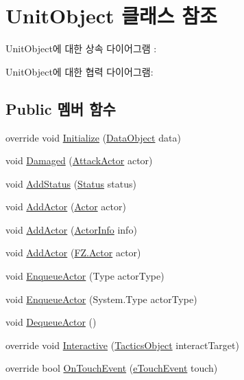 \hypertarget{class_unit_object}{}\section{Unit\+Object 클래스 참조}
\label{class_unit_object}


Unit\+Object에 대한 상속 다이어그램 \+: 


Unit\+Object에 대한 협력 다이어그램\+:
\subsection*{Public 멤버 함수}
\begin{DoxyCompactItemize}
\item 
override void \hyperlink{class_unit_object_acc70df752878272e4f9d0f0dc1f68f84}{Initialize} (\hyperlink{class_data_object}{Data\+Object} data)
\item 
void \hyperlink{class_unit_object_a36511c5c48346ec7aba58e0150b3d462}{Damaged} (\hyperlink{class_attack_actor}{Attack\+Actor} actor)
\item 
void \hyperlink{class_unit_object_a62836ee6382c85a0128d208baf118088}{Add\+Status} (\hyperlink{struct_status}{Status} status)
\item 
void \hyperlink{class_action_object_a56caea069fa424581114bd41b299944c}{Add\+Actor} (\hyperlink{class_f_z_1_1_actor}{Actor} actor)
\item 
void \hyperlink{class_action_object_a25c60d577ecf4dedb7d5af668fe1c8e7}{Add\+Actor} (\hyperlink{class_actor_info}{Actor\+Info} info)
\item 
void \hyperlink{interface_f_z_1_1_i_actor_queue_a913b199f922223b26cf05efa96c14139}{Add\+Actor} (\hyperlink{class_f_z_1_1_actor}{F\+Z.\+Actor} actor)
\item 
void \hyperlink{class_action_object_a1aa21a0bbc88cf7456dd20005d55e972}{Enqueue\+Actor} (Type actor\+Type)
\item 
void \hyperlink{interface_f_z_1_1_i_actor_queue_ad0ffa88154fd9f44e0a8828b31a10c03}{Enqueue\+Actor} (System.\+Type actor\+Type)
\item 
void \hyperlink{class_action_object_a57bca80c5d001408121c21ee46422976}{Dequeue\+Actor} ()
\item 
override void \hyperlink{class_action_object_a82d2b5b3c03a27d913df32d2bb9e8406}{Interactive} (\hyperlink{class_tactics_object}{Tactics\+Object} interact\+Target)
\item 
override bool \hyperlink{class_action_object_a0f3ad33fd4ec0478fbe397aaa92c257e}{On\+Touch\+Event} (\hyperlink{_touch_manager_8cs_ae33e321a424fe84ba8b2fdb81ad40a68}{e\+Touch\+Event} touch)

\end{DoxyCompactItemize}

